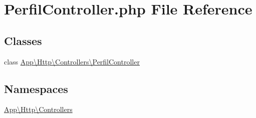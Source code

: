 \hypertarget{_perfil_controller_8php}{}\section{Perfil\+Controller.\+php File Reference}
\label{_perfil_controller_8php}
\subsection*{Classes}
\begin{DoxyCompactItemize}
\item 
class \mbox{\hyperlink{class_app_1_1_http_1_1_controllers_1_1_perfil_controller}{App\textbackslash{}\+Http\textbackslash{}\+Controllers\textbackslash{}\+Perfil\+Controller}}
\end{DoxyCompactItemize}
\subsection*{Namespaces}
\begin{DoxyCompactItemize}
\item 
 \mbox{\hyperlink{namespace_app_1_1_http_1_1_controllers}{App\textbackslash{}\+Http\textbackslash{}\+Controllers}}
\end{DoxyCompactItemize}
